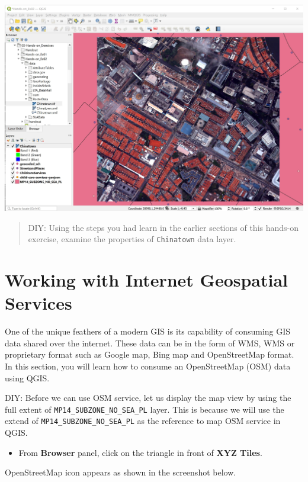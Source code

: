 \documentclass[
  letterpaper,
  DIV=11,
  numbers=noendperiod]{scrreprt}
\providecommand{\tightlist}{%
  \setlength{\itemsep}{0pt}\setlength{\parskip}{0pt}}\usepackage{longtable,booktabs,array}
\begin{document}
\includegraphics{./img02/image28.jpg}

\begin{quote}
DIY: Using the steps you had learn in the earlier sections of this
hands-on exercise, examine the properties of \texttt{Chinatown} data
layer.
\end{quote}

\hypertarget{working-with-internet-geospatial-services}{%
\section{Working with Internet Geospatial
Services}\label{working-with-internet-geospatial-services}}

One of the unique feathers of a modern GIS is its capability of
consuming GIS data shared over the internet. These data can be in the
form of WMS, WMS or proprietary format such as Google map, Bing map and
OpenStreetMap format. In this section, you will learn how to consume an
OpenStreetMap (OSM) data using QGIS.

DIY: Before we can use OSM service, let us display the map view by using
the full extent of \texttt{MP14\_SUBZONE\_NO\_SEA\_PL} layer. This is
because we will use the extend of \texttt{MP14\_SUBZONE\_NO\_SEA\_PL} as
the reference to map OSM service in QGIS.

\begin{itemize}
\tightlist
\item
  From \textbf{Browser} panel, click on the triangle in front of
  \textbf{XYZ Tiles}.
\end{itemize}

OpenStreetMap icon appears as shown in the screenshot below.
\end{document}
